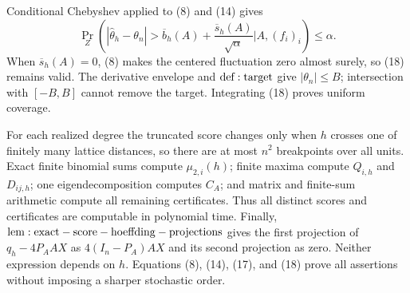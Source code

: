 Conditional Chebyshev applied to (8) and (14) gives
\[
 \Pr_Z\!\left(
 |\widehat\theta_h-\theta_n|>
 \overline b_h(A)+\frac{\overline s_h(A)}{\sqrt\alpha}
 \mathrel{\Big|}A,(f_i)_i\right)\leq\alpha.
\tag{18}
\]
When \(\overline s_h(A)=0\), (8) makes the centered fluctuation zero almost surely, so (18) remains valid.  The derivative envelope and \({\rm def:target}\) give \(|\theta_n|\leq B\); intersection with \([-B,B]\) cannot remove the target.  Integrating (18) proves uniform coverage.

For each realized degree the truncated score changes only when \(h\) crosses one of finitely many lattice distances, so there are at most \(n^2\) breakpoints over all units.  Exact finite binomial sums compute \(\mu_{2,i}(h)\); finite maxima compute \(Q_{i,h}\) and \(D_{ij,h}\); one eigendecomposition computes \(C_A\); and matrix and finite-sum arithmetic compute all remaining certificates.  Thus all distinct scores and certificates are computable in polynomial time.  Finally, \({\rm lem:exact-score-hoeffding-projections}\) gives the first projection of \(q_h-4P_AAX\) as \(4(I_n-P_A)AX\) and its second projection as zero.  Neither expression depends on \(h\).  Equations (8), (14), (17), and (18) prove all assertions without imposing a sharper stochastic order.